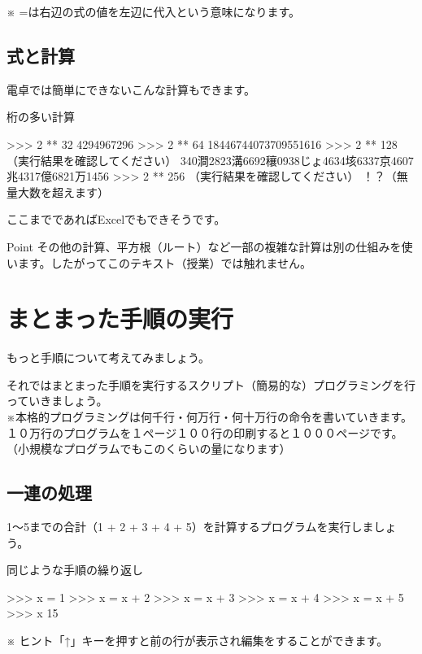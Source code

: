 \documentclass[11pt,a4paper,dvipdfmx,titlepage]{jsreport}
\begin{document}
 ※ =は右辺の式の値を左辺に代入という意味になります。

\subsection{式と計算}
 電卓では簡単にできないこんな計算もできます。
\begin{grabox}{桁の多い計算}
\begin{listingcont}
>>> 2 ** 32
4294967296
>>> 2 ** 64
18446744073709551616
>>> 2 ** 128
（実行結果を確認してください）
  340澗2823溝6692穰0938じょ4634垓6337京4607兆4317億6821万1456
>>> 2 ** 256
（実行結果を確認してください）
  ！？（無量大数を超えます）
\end{listingcont}
\end{grabox}

ここまでであればExcelでもできそうです。
\begin{hipoint}{Point}
 その他の計算、平方根（ルート）など一部の複雑な計算は別の仕組みを使います。したがってこのテキスト（授業）では触れません。
\end{hipoint}


\section{まとまった手順の実行}
もっと手順について考えてみましょう。

それではまとまった手順を実行するスクリプト（簡易的な）プログラミングを行っていきましょう。\\

※本格的プログラミングは何千行・何万行・何十万行の命令を書いていきます。\\
１０万行のプログラムを１ページ１００行の印刷すると１０００ページです。（小規模なプログラムでもこのくらいの量になります）

\subsection{一連の処理}
1～5までの合計（1 + 2 + 3 + 4 + 5）を計算するプログラムを実行しましょう。

\begin{grabox}{同じような手順の繰り返し}
\begin{listing}{1}
>>> x = 1 
>>> x = x + 2
>>> x = x + 3
>>> x = x + 4
>>> x = x + 5
>>> x
15
\end{listing}
\end{grabox}
※ ヒント「↑」キーを押すと前の行が表示され編集をすることができます。
\end{document}
